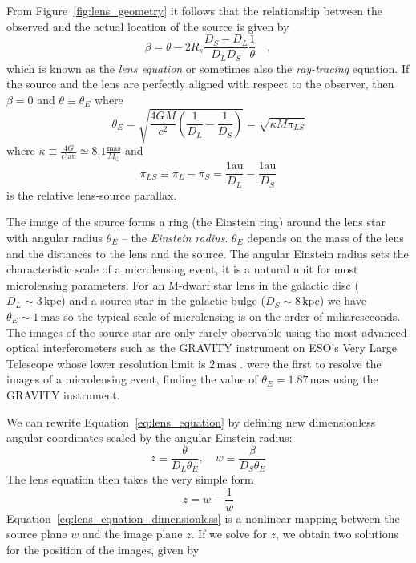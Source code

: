 \documentclass[12pt,dvipsnames]{report}
\begin{document}
From Figure~\ref{fig:lens_geometry} it follows that the relationship between
the observed and the actual location of the source is given by
\begin{equation}
    \beta=\theta-2 R_s \frac{D_S-D_L}{D_LD_S}
    \frac{1}{\theta}\quad,
    \label{eq:lens_equation}
\end{equation}
which is known as the \emph{lens equation} or sometimes also the \emph{ray-tracing}
equation. If the source and the lens are perfectly aligned with respect to the observer,
then $\beta=0$ and $\theta\equiv\theta_E$ where
\begin{equation}
    \theta_E= \sqrt{ \frac{4GM}{c^2} \left( \frac{1}{D_L} - \frac{1}{D_S} \right)}=
    \sqrt{\kappa M\pi_{LS}}
    \label{eq:angular_einstein_radius}
\end{equation}
where $\kappa \equiv \frac{4 G}{c^{2} \mathrm{au}} \simeq 8.1 \frac{\mathrm{mas}}{M_{\odot}}$
and
\begin{equation}
    \pi_{LS}\equiv\pi_L - \pi_S=\frac{1\mathrm{au}}{D_L}-\frac{1\mathrm{au}}{D_S}
\end{equation}
is the relative lens-source parallax.

The image of the source forms a ring (the Einstein ring) around the lens star
with angular radius $\theta_E$ -- the \emph{Einstein radius}. $\theta_E$
depends on the mass of the lens and the distances to the lens and the source.
The angular Einstein radius sets the characteristic scale of a microlensing
event, it is a natural unit for most microlensing parameters. For an M-dwarf
star lens in the galactic disc ($D_L\sim 3\,\textrm{kpc}$) and a source star in
the galactic bulge ($D_S\sim 8\,\textrm{kpc}$) we have $\theta_E\sim
    1\,\textrm{mas}$ so the typical scale of microlensing is on the order of
miliarcseconds. The images of the source star are only rarely observable using
the most advanced optical interferometers such as the GRAVITY instrument on
ESO's Very Large Telescope whose lower resolution limit is $2\,\textrm{mas}$
\citep{arXiv:1705.02345}. \cite{2019ApJ...871...70D} were the first to resolve
the images of a microlensing event, finding the value of
$\theta_E=1.87\,\textrm{mas}$ using the GRAVITY instrument.

We can rewrite Equation~\ref{eq:lens_equation} by defining new dimensionless
angular coordinates scaled by the angular Einstein radius:
\begin{equation}
    z\equiv \frac{\theta}{D_L\theta_E}, \quad w\equiv\frac{\beta}{D_S\theta_E}
\end{equation}
The lens equation then takes the very simple form
\begin{equation}
    z= w- \frac{ 1}{w}
    \label{eq:lens_equation_dimensionless}
\end{equation}
Equation~\ref{eq:lens_equation_dimensionless} is a nonlinear mapping between the
source plane $w$ and the image plane $z$.
If we solve for $z$, we obtain two solutions for the position of the images, given by
\end{document}
